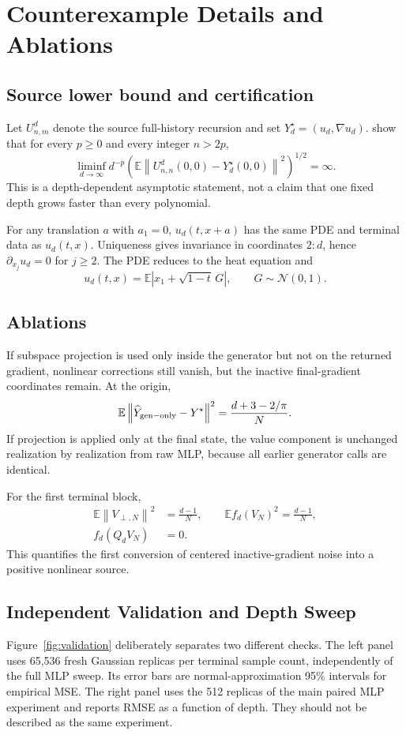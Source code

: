 \documentclass{article}
\newcommand{\E}{\mathbb E}
\newcommand{\norm}[1]{\left\lVert #1\right\rVert}
\begin{document}
\section{Counterexample Details and Ablations}
\label{app:counter}
\subsection{Source lower bound and certification}
Let $U^d_{n,m}$ denote the source full-history recursion and set $Y_d^\star=(u_d,\nabla u_d)$. \citet{HutzenthalerNguyen2025} show that for every $p\ge0$ and every integer $n>2p$,
\[
\liminf_{d\to\infty}d^{-p}
\left(\E\norm{U^d_{n,n}(0,0)-Y_d^\star(0,0)}^2\right)^{1/2}
=\infty.
\]
This is a depth-dependent asymptotic statement, not a claim that one fixed depth grows faster than every polynomial.

For any translation $a$ with $a_1=0$, $u_d(t,x+a)$ has the same PDE and terminal data as $u_d(t,x)$. Uniqueness gives invariance in coordinates $2{:}d$, hence $\partial_{x_j}u_d=0$ for $j\ge2$. The PDE reduces to the heat equation and
\[
u_d(t,x)=\E|x_1+\sqrt{1-t}\,G|,
\qquad G\sim\mathcal N(0,1).
\]

\subsection{Ablations}
If subspace projection is used only inside the generator but not on the returned gradient, nonlinear corrections still vanish, but the inactive final-gradient coordinates remain. At the origin,
\[
\E\norm{\widehat Y_{\rm gen-only}-Y^\star}^2
=\frac{d+3-2/\pi}{N}.
\]
If projection is applied only at the final state, the value component is unchanged realization by realization from raw MLP, because all earlier generator calls are identical.

For the first terminal block,
\begin{align*}
\E\norm{V_{\perp,N}}^2&=\frac{d-1}{N},\qquad
\E f_d(V_N)^2=\frac{d-1}{N},\\
f_d(Q_dV_N)&=0.
\end{align*}
This quantifies the first conversion of centered inactive-gradient noise into a positive nonlinear source.

\subsection{Independent Validation and Depth Sweep}
Figure~\ref{fig:validation} deliberately separates two different checks. The left panel uses 65,536 fresh Gaussian replicas per terminal sample count, independently of the full MLP sweep. Its error bars are normal-approximation 95\% intervals for empirical MSE. The right panel uses the 512 replicas of the main paired MLP experiment and reports RMSE as a function of depth. They should not be described as the same experiment.
\end{document}
